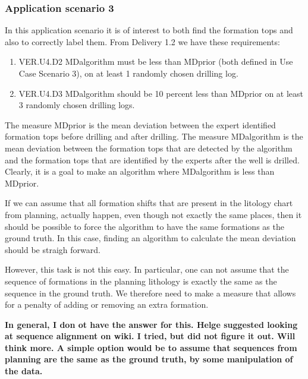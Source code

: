 \documentclass{article}
\theoremstyle{theorem}
\theoremstyle{definition}
\begin{document}
\subsubsection{Application scenario 3}

In this application scenario it is of interest to both find the formation tops and also to correctly label them.  From Delivery 1.2 we have these requirements:

\begin{enumerate}
\item VER.U4.D2 MDalgorithm must be less than MDprior (both defined in Use Case Scenario 3), on at least 1 randomly chosen drilling log. 
\item VER.U4.D3 MDalgorithm should be 10 percent less than MDprior on at least 3 randomly chosen drilling logs. 
\end{enumerate}

The measure MDprior is the mean deviation between the expert identified formation tops before drilling and after drilling. The measure MDalgorithm is the mean deviation between the formation tops that are detected by the algorithm and the formation tops that are identified by the experts after the well is drilled. Clearly, it is a goal to make an algorithm where MDalgorithm is less than MDprior. 

If we can assume that all formation shifts that are present in the litology chart from planning, actually happen, even though not exactly the same places, then it should be possible to force the algorithm to have the same formations as the ground truth.  In this case, finding an algorithm to calculate the mean deviation should be straigh forward. 

However, this task is not this easy.  In particular, one can not assume that the sequence of formations in the planning lithology is exactly the same as the sequence in the ground truth.  We therefore need to make a measure that allows for a penalty of adding or removing an extra formation.

{\bf In general, I don ot have the answer for this.  Helge suggested looking at sequence alignment on wiki. I tried, but did not figure it out. Will think more.  A simple option would be to assume that sequences from planning are the same as the ground truth, by some manipulation of the data.}



\end{document}
